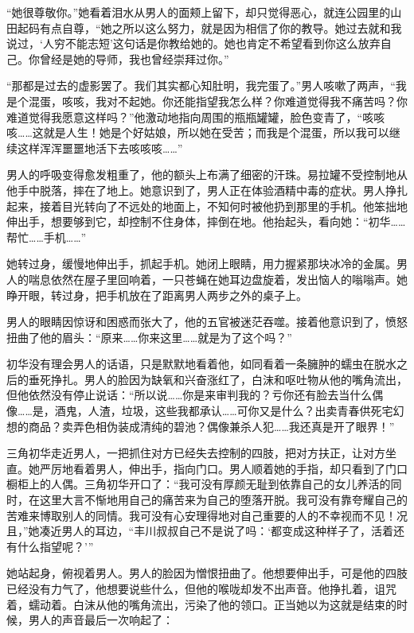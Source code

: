 \documentclass{article}
\begin{document}
“她很尊敬你。”她看着泪水从男人的面颊上留下，却只觉得恶心，就连公园里的山田起码有点自尊，“她之所以这么努力，就是因为相信了你的教导。她过去就和我说过，‘人穷不能志短’这句话是你教给她的。她也肯定不希望看到你这么放弃自己。你曾经是她的导师，我也曾经崇拜过你。”



“那都是过去的虚影罢了。我们其实都心知肚明，我完蛋了。”男人咳嗽了两声，“我是个混蛋，咳咳，我对不起她。你还能指望我怎么样？你难道觉得我不痛苦吗？你难道觉得我愿意这样吗？”他激动地指向周围的瓶瓶罐罐，脸色变青了，“咳咳咳……这就是人生！她是个好姑娘，所以她在受苦；而我是个混蛋，所以我可以继续这样浑浑噩噩地活下去咳咳咳……”



男人的呼吸变得愈发粗重了，他的额头上布满了细密的汗珠。易拉罐不受控制地从他手中脱落，摔在了地上。她意识到了，男人正在体验酒精中毒的症状。男人挣扎起来，接着目光转向了不远处的地面上，不知何时被他扔到那里的手机。他笨拙地伸出手，想要够到它，却控制不住身体，摔倒在地。他抬起头，看向她：“初华……帮忙……手机……”



她转过身，缓慢地伸出手，抓起手机。她闭上眼睛，用力握紧那块冰冷的金属。男人的喘息依然在屋子里回响着，一只苍蝇在她耳边盘旋着，发出恼人的嗡嗡声。她睁开眼，转过身，把手机放在了距离男人两步之外的桌子上。



男人的眼睛因惊讶和困惑而张大了，他的五官被迷茫吞噬。接着他意识到了，愤怒扭曲了他的眉头：“原来……你来这里……就是为了这个吗？”



初华没有理会男人的话语，只是默默地看着他，如同看着一条臃肿的蠕虫在脱水之后的垂死挣扎。男人的脸因为缺氧和兴奋涨红了，白沫和呕吐物从他的嘴角流出，但他依然没有停止说话：“所以说……你是来审判我的？亏你还有脸去当什么偶像……是，酒鬼，人渣，垃圾，这些我都承认……可你又是什么？出卖青春供死宅幻想的商品？卖弄色相伪装成清纯的碧池？偶像兼杀人犯……我还真是开了眼界！”



三角初华走近男人，一把抓住对方已经失去控制的四肢，把对方扶正，让对方坐直。她严厉地看着男人，伸出手，指向门口。男人顺着她的手指，却只看到了门口橱柜上的人偶。三角初华开口了：“我可没有厚颜无耻到依靠自己的女儿养活的同时，在这里大言不惭地用自己的痛苦来为自己的堕落开脱。我可没有靠夸耀自己的苦难来博取别人的同情。我可没有心安理得地对自己重要的人的不幸视而不见！况且，”她凑近男人的耳边，“丰川叔叔自己不是说了吗：‘都变成这种样子了，活着还有什么指望呢？’”



她站起身，俯视着男人。男人的脸因为憎恨扭曲了。他想要伸出手，可是他的四肢已经没有力气了，他想要说些什么，但他的喉咙却发不出声音。他挣扎着，诅咒着，蠕动着。白沫从他的嘴角流出，污染了他的领口。正当她以为这就是结束的时候，男人的声音最后一次响起了：
\end{document}
